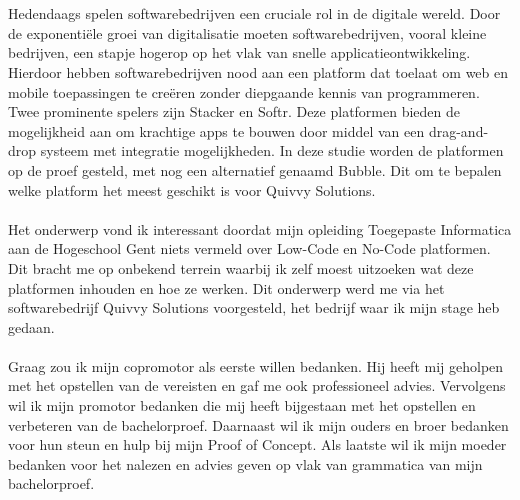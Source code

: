 
\chapter*{}%
\label{ch:voorwoord}

Hedendaags spelen softwarebedrijven een cruciale rol in de digitale wereld. 
Door de exponentiële groei van digitalisatie moeten softwarebedrijven, vooral kleine bedrijven, 
een stapje hogerop op het vlak van snelle applicatieontwikkeling. Hierdoor hebben softwarebedrijven nood aan 
een platform dat toelaat om web en mobile toepassingen te creëren zonder diepgaande kennis van programmeren. 
Twee prominente spelers zijn Stacker en Softr. Deze platformen bieden de mogelijkheid aan om krachtige apps te bouwen 
door middel van een drag-and-drop systeem met integratie mogelijkheden. In deze studie worden de platformen op de proef gesteld, 
met nog een alternatief genaamd Bubble. Dit om te bepalen welke platform het meest geschikt is voor Quivvy Solutions.
\\
\\
Het onderwerp vond ik interessant doordat mijn opleiding Toegepaste Informatica aan de Hogeschool Gent niets vermeld over Low-Code en No-Code platformen.
Dit bracht me op onbekend terrein waarbij ik zelf moest uitzoeken wat deze platformen inhouden en hoe ze werken. Dit onderwerp werd me via 
het softwarebedrijf Quivvy Solutions voorgesteld, het bedrijf waar ik mijn stage heb gedaan.
\\
\\
Graag zou ik mijn copromotor als eerste willen bedanken. Hij heeft mij geholpen met het opstellen van de vereisten en gaf me ook
professioneel advies. Vervolgens wil ik mijn promotor bedanken die mij heeft bijgestaan met het opstellen en verbeteren van de bachelorproef. Daarnaast 
wil ik mijn ouders en broer bedanken voor hun steun en hulp bij mijn Proof of Concept. 
Als laatste wil ik mijn moeder bedanken voor het nalezen en advies geven op vlak van grammatica van mijn bachelorproef.
